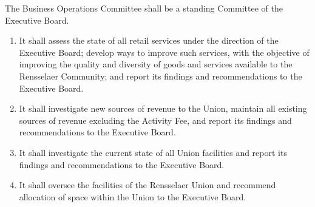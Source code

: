 \item The Business Operations Committee shall be a standing Committee of the Executive Board.
\begin{enumerate}

    \item It shall assess the state of all retail services under the direction of the Executive Board; develop ways to improve such services, with the objective of improving the quality and diversity of goods and services available to the Rensselaer Community; and report its findings and recommendations to the Executive Board.

    \item It shall investigate new sources of revenue to the Union, maintain all existing sources of revenue excluding the Activity Fee, and report its findings and recommendations to the Executive Board.

    \item It shall investigate the current state of all Union facilities and report its findings and recommendations to the Executive Board.

    \item It shall oversee the facilities of the Rensselaer Union and recommend allocation of space within the Union to the Executive Board.

\end{enumerate}
